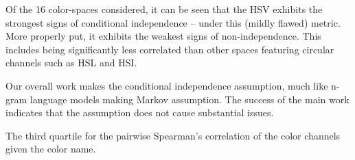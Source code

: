 \documentclass[11pt,a4paper]{article}
\begin{document}
Of the 16 color-spaces considered, it can be seen that the HSV exhibits the strongest signs of conditional independence -- under this (mildly flawed) metric.
More properly put, it exhibits the weakest signs of non-independence.
This includes being significantly less correlated than other spaces featuring circular channels such as HSL and HSI.

Our overall work makes the conditional independence assumption, much like n-gram language models making Markov assumption.
The success of the main work indicates that the assumption does not cause substantial issues.



\begin{table}
	\centering
	\caption{\label{tbl:colorcor} The third quartile for the pairwise Spearman's correlation of the color channels given the color name.}
	
\end{table}
\end{document}
